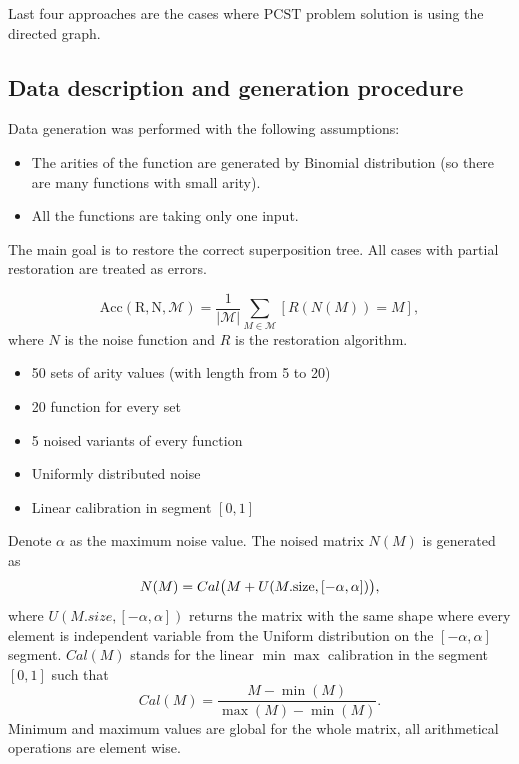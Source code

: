 \documentclass[11pt, tightenlines, twoside, onecolumn, nofloats, nobibnotes, nofootinbib, superscriptaddress, noshowpacks, centertags]{revtex4}
\begin{document}
Last four approaches are the cases where $\text{PCST}$ problem solution is using the directed graph.

\subsection{Data description and generation procedure}

Data generation was performed with the following assumptions:
\begin{itemize}
    \item The arities of the function are generated by Binomial distribution (so there are many functions with small arity).
    \item All the functions are taking only one input.
\end{itemize}

The main goal is to restore the correct superposition tree. All cases with partial restoration are treated as errors.

\[\mathrm{Acc(R, N, \mathcal{M})} = \frac{1}{|\mathcal{M}|}\sum\limits_{M\in\mathcal{M}}\left[R(N(M))=M\right],\]
where $N$ is the noise function and $R$ is the restoration algorithm.
\begin{minipage}[B]{0.49\textwidth}
    \begin{itemize}
        \item 50 sets of arity values (with length from 5 to 20)
        \item 20 function for every set
        \item 5 noised variants of every function
    \end{itemize}
\end{minipage}
\begin{minipage}[B]{0.49\textwidth}
    \begin{itemize}
        \item Uniformly distributed noise
        \item Linear calibration in segment $[0,1]$
    \end{itemize}
\end{minipage}
\begin{remark}
    Denote $\alpha$ as the maximum noise value. The noised matrix $N(M)$ is generated as
    $$
        N(M) = Cal\big( M + U(M.\text{size}, [-\alpha, \alpha])\big),
    $$
    where $U(M.size, [-\alpha, \alpha])$ returns the matrix with the same shape where every element is independent variable from the Uniform distribution on the $[-\alpha,\alpha]$ segment. $Cal(M)$ stands for the linear $\min\max$ calibration in the segment $[0, 1]$ such that 
    $$
        Cal(M) = \frac{M - \min(M)}{\max(M) - \min(M)}.
    $$
    Minimum and maximum values are global for the whole matrix, all arithmetical operations are element wise.
\end{remark}
\end{document}
